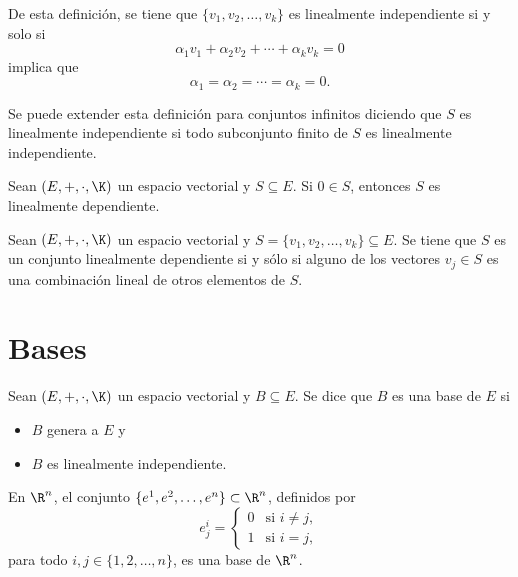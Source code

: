 \documentclass[a4,11pt]{aleph-notas}
\begin{document}
\begin{advertencia}
    De esta definición, se tiene que $\{v_1,v_2,\ldots,v_k\}$ es linealmente independiente si y solo si
    \[
        \alpha_1 v_1 + \alpha_2 v_2 + \cdots + \alpha_k v_k = 0
    \]
    implica que
    \[
        \alpha_1 = \alpha_2 = \cdots = \alpha_k = 0.
    \]
\end{advertencia}

\begin{advertencia}
    Se puede extender esta definición para conjuntos infinitos diciendo que $S$ es linealmente independiente si todo subconjunto finito de $S$ es linealmente independiente.
\end{advertencia}

\begin{teo}
    Sean $(E,+,\cdot,\K)$ un espacio vectorial y $S\subseteq E$. Si $0\in S$, entonces $S$ es linealmente dependiente.
\end{teo}

\begin{teo}
    Sean $(E,+,\cdot,\K)$ un espacio vectorial y $S=\{v_1,v_2,\ldots,v_k\}\subseteq E$. Se tiene que $S$ es un conjunto linealmente dependiente si y sólo si alguno de los vectores $v_j\in S$ es una combinación lineal de otros elementos de $S$.
\end{teo}

\section{Bases}

\begin{defi}
    Sean $(E,+,\cdot,\K)$ un espacio vectorial y $B\subseteq E$. Se dice que $B$ es una base de $E$ si 
    \begin{itemize}
        \item $B$ genera a $E$ y 
        \item $B$ es linealmente independiente. 
    \end{itemize}
\end{defi}


\begin{teo}
    En $\R^n$, el conjunto $\{e^1,e^2,\ldots,e^n\}\subset\R^n$, definidos por 
    \[
        e^i_j=
        \begin{cases}
            0& \text{si }i\neq j,\\
            1& \text{si }i= j,
        \end{cases}
    \]
    para todo $i,j\in\{1,2,\ldots,n\}$, es una base de $\R^n$.
\end{teo}
\end{document}
